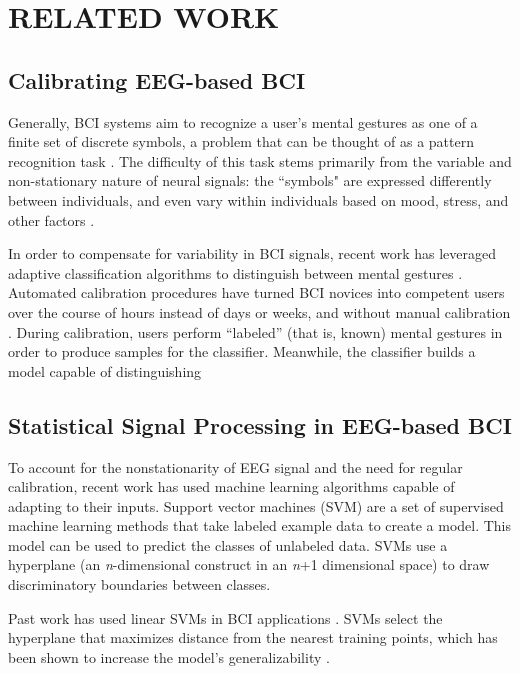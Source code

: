 \section{\uppercase{Related Work}}
\label{sec:related}

\subsection{Calibrating EEG-based BCI}

\noindent Generally, BCI systems aim to recognize a user's mental gestures as one of a finite set of discrete symbols, a problem that can be thought of as a pattern recognition task \cite{lotte_review_2007}. The difficulty of this task stems primarily from the variable and non-stationary nature of neural signals: the ``symbols" are expressed differently between individuals, and even vary within individuals based on mood, stress, and other factors \cite{vidaurre_machine-learning-based_2011}. 

In order to compensate for variability in BCI signals, recent work has leveraged adaptive classification algorithms to distinguish between mental gestures \cite{lotte_review_2007,vidaurre_machine-learning-based_2011,friedrich2013whatever}. Automated calibration procedures have turned BCI novices into competent users over the course of hours instead of days or weeks, and without manual calibration \cite{vidaurre_machine-learning-based_2011}. During calibration, users perform ``labeled'' (that is, known) mental gestures in order to produce samples for the classifier. Meanwhile, the classifier builds a model capable of distinguishing  

\subsection{Statistical Signal Processing in EEG-based BCI}

To account for the nonstationarity of EEG signal and the need for regular calibration, recent work has used machine learning algorithms capable of adapting to their inputs. Support vector machines (SVM) are a set of supervised machine learning methods that take labeled example data to create a model. This model can be used to predict the classes of unlabeled data. SVMs use a hyperplane (an \emph{n}-dimensional construct in an \emph{n}+1 dimensional space) to draw discriminatory boundaries between classes. 

Past work has used linear SVMs in BCI applications \cite{garrett_comparison_2003,grierson_better_2011}. SVMs select the hyperplane that maximizes distance from the nearest training points, which has been shown to increase the model's generalizability \cite{burges_tutorial_1998}. 

